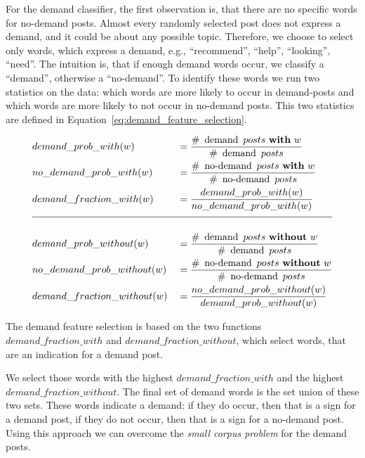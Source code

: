 For the demand classifier, the first observation is, that there are no specific words for no-demand posts.
Almost every randomly selected post does not express a demand, and it could be about any possible topic.
Therefore, we choose to select only words, which express a demand, e.g., ``recommend'', ``help'', ``looking'', ``need''.
The intuition is, that if enough demand words occur, we classify a ``demand'', otherwise a ``no-demand''.
To identify these words we run two statistics on the data:
which words are more likely to occur in demand-posts and which words are more likely to not occur in no-demand posts.
This two statistics are defined in Equation~\ref{eq:demand_feature_selection}.
\begin{equationBlock}
	\begin{alignat*}{3}
		&demand\_prob\_with(w) &&= \dfrac{
		 		\#~\operatorname{demand}~posts~\mathbf{with}~w
			}{
				 \#~\operatorname{demand}~posts
			}
			\\
		&no\_demand\_prob\_with(w) &&= \dfrac{
		 		\#~\operatorname{no-demand}~posts~\mathbf{with}~w
			}{
				 \#~\operatorname{no-demand}~posts
			}
			\\
		&demand\_fraction\_with(w) &&= \frac{
				demand\_prob\_with(w)
			}{
				no\_demand\_prob\_with(w)
			}
			\\[2mm]
			\hline
			\\[0.1mm]
		&demand\_prob\_without(w) &&= \dfrac{
		 		\#~\operatorname{demand}~posts~\mathbf{without}~w
			}{
				 \#~\operatorname{demand}~posts
			}
			\\
		&no\_demand\_prob\_without(w) &&= \dfrac{
		 		\#~\operatorname{no-demand}~posts~\mathbf{without}~w
			}{
				 \#~\operatorname{no-demand}~posts
			}
			\\
		&demand\_fraction\_without(w) &&= \frac{
				no\_demand\_prob\_without(w)
			}{
				demand\_prob\_without(w)
			}
	\end{alignat*}
	\caption{The demand feature selection is based on the two functions $demand\_fraction\_with$ and $demand\_fraction\_without$, which select words, that are an indication for a demand post.}
	\label{eq:demand_feature_selection}
\end{equationBlock}
We select those words with the highest $demand\_fraction\_with$ and the highest $demand\_fraction\_without$.
The final set of demand words is the set union of these two sets.
These words indicate a demand: if they do occur, then that is a sign for a demand post, if they do not occur, then that is a sign for a no-demand post.
Using this approach we can overcome the \emph{small corpus problem} for the demand posts.

